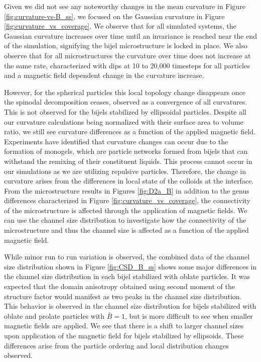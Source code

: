 Given we did not see any noteworthy changes in the mean curvature in
Figure \ref{fig:curvature-vs-B_ss}, we focused on the Gaussian curvature
in Figure \ref{fig:curvature_vs_coverage}. We observe that for all
simulated systems, the Gaussian curvature increases over time until an
invariance is reached near the end of the simulation, signifying the
bijel microstructure is locked in place. We also observe that for all
microstructures the curvature over time does not increase at the same
rate, characterized with dips at 10 to 20,000 timesteps for all
particles and a magnetic field dependent change in the curvature
increase.

However, for the spherical particles this local topology change
disappears once the spinodal decomposition ceases, observed as a
convergence of all curvatures. This is not observed for the bijels
stabilized by ellipsoidal particles. Despite all our curvature
calculations being normalized with their surface area to volume ratio,
we still see curvature differences as a function of the applied magnetic
field. Experiments have identified that curvature changes can occur due
to the formation of monogels, which are particle networks formed from
bijels that can withstand the remixing of their constituent liquids.
\cite{sanz_colloidal_2009, lee_making_2013} This process cannot occur in
our simulations as we are utilizing repulsive particles. Therefore, the
change in curvature arises from the differences in local state of the
colloids at the interface. From the microstructure results in Figures \ref{fig:D2a_B}
in addition to the genus differences characterized in Figure \ref{fig:curvature_vs_coverage},
the connectivity of the microstructure is affected through the application of magnetic fields.
We can use the channel size distribution to investigate how the connectivity of the microstructure and thus the 
channel size is affected as a function of the applied magnetic field.

While minor run to run variation is observed, the combined data of the channel size distribution shown in Figure \ref{fig:CSD_B_ss} shows some major differences 
in the channel size distribution in each bijel stabilized with oblate particles. It was expected that the domain anisotropy obtained using second moment of the 
structure factor would manifest as two peaks in the channel size distribution. \cite{karthikeyan_formation_2024} This behavior is observed in the channel size 
distribution for bijels stabilized with oblate and prolate particles with $\bar{B} = 1$, but is more difficult to see when smaller magnetic fields are applied. 
We see that there is a shift to larger channel sizes upon application of the magnetic field for bijels stabilized by ellipsoids. These differences arise from the 
particle ordering and local distribution changes observed. 

